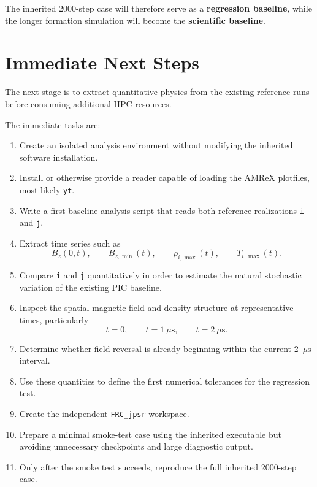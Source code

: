 \documentclass[11pt,a4paper]{article}
\begin{document}
The inherited 2000-step case will therefore serve as a \textbf{regression baseline}, while the longer formation simulation will become the \textbf{scientific baseline}.

\section{Immediate Next Steps}

The next stage is to extract quantitative physics from the existing reference runs before consuming additional HPC resources.

The immediate tasks are:

\begin{enumerate}[label=\arabic*.]
    \item Create an isolated analysis environment without modifying the inherited software installation.
    
    \item Install or otherwise provide a reader capable of loading the AMReX plotfiles, most likely \texttt{yt}.
    
    \item Write a first baseline-analysis script that reads both reference realizations \texttt{i} and \texttt{j}.
    
    \item Extract time series such as
    \[
    B_z(0,t),
    \qquad
    B_{z,\min}(t),
    \qquad
    \rho_{i,\max}(t),
    \qquad
    T_{i,\max}(t).
    \]
    
    \item Compare \texttt{i} and \texttt{j} quantitatively in order to estimate the natural stochastic variation of the existing PIC baseline.
    
    \item Inspect the spatial magnetic-field and density structure at representative times, particularly
    \[
    t=0,\qquad
    t=1~\mu\mathrm{s},\qquad
    t=2~\mu\mathrm{s}.
    \]
    
    \item Determine whether field reversal is already beginning within the current 2~\(\mu\mathrm{s}\) interval.
    
    \item Use these quantities to define the first numerical tolerances for the regression test.
    
    \item Create the independent \texttt{FRC\_jpsr} workspace.
    
    \item Prepare a minimal smoke-test case using the inherited executable but avoiding unnecessary checkpoints and large diagnostic output.
    
    \item Only after the smoke test succeeds, reproduce the full inherited 2000-step case.
\end{enumerate}
\end{document}
